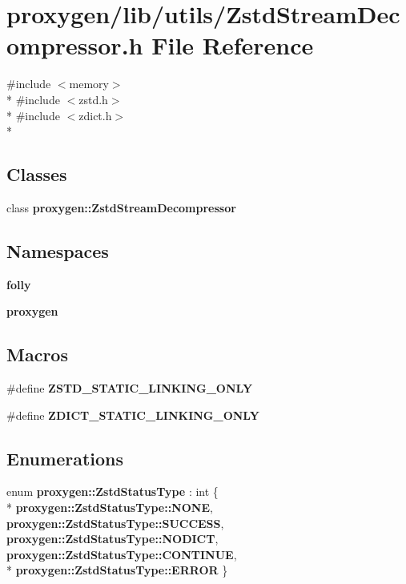 \section{proxygen/lib/utils/\+Zstd\+Stream\+Decompressor.h File Reference}
\label{ZstdStreamDecompressor_8h}
{\ttfamily \#include $<$memory$>$}\\*
{\ttfamily \#include $<$zstd.\+h$>$}\\*
{\ttfamily \#include $<$zdict.\+h$>$}\\*
\subsection*{Classes}
\begin{DoxyCompactItemize}
\item 
class {\bf proxygen\+::\+Zstd\+Stream\+Decompressor}
\end{DoxyCompactItemize}
\subsection*{Namespaces}
\begin{DoxyCompactItemize}
\item 
 {\bf folly}
\item 
 {\bf proxygen}
\end{DoxyCompactItemize}
\subsection*{Macros}
\begin{DoxyCompactItemize}
\item 
\#define {\bf Z\+S\+T\+D\+\_\+\+S\+T\+A\+T\+I\+C\+\_\+\+L\+I\+N\+K\+I\+N\+G\+\_\+\+O\+N\+LY}
\item 
\#define {\bf Z\+D\+I\+C\+T\+\_\+\+S\+T\+A\+T\+I\+C\+\_\+\+L\+I\+N\+K\+I\+N\+G\+\_\+\+O\+N\+LY}
\end{DoxyCompactItemize}
\subsection*{Enumerations}
\begin{DoxyCompactItemize}
\item 
enum {\bf proxygen\+::\+Zstd\+Status\+Type} \+: int \{ \\*
{\bf proxygen\+::\+Zstd\+Status\+Type\+::\+N\+O\+NE}, 
{\bf proxygen\+::\+Zstd\+Status\+Type\+::\+S\+U\+C\+C\+E\+SS}, 
{\bf proxygen\+::\+Zstd\+Status\+Type\+::\+N\+O\+D\+I\+CT}, 
{\bf proxygen\+::\+Zstd\+Status\+Type\+::\+C\+O\+N\+T\+I\+N\+UE}, 
\\*
{\bf proxygen\+::\+Zstd\+Status\+Type\+::\+E\+R\+R\+OR}
 \}
\end{DoxyCompactItemize}


